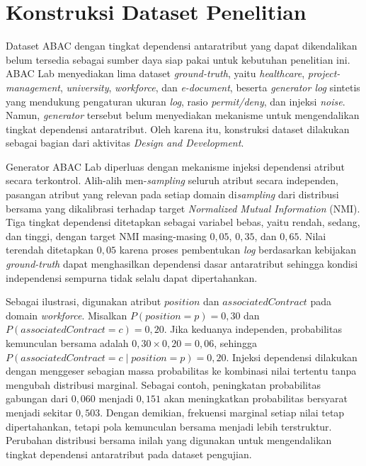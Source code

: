 \section{Konstruksi Dataset Penelitian}

Dataset ABAC dengan tingkat dependensi antaratribut yang dapat dikendalikan belum tersedia sebagai sumber daya siap pakai untuk kebutuhan penelitian ini. 
ABAC Lab menyediakan lima dataset \textit{ground-truth}, yaitu \textit{healthcare}, \textit{project-management}, \textit{university}, \textit{workforce}, dan \textit{e-document}, beserta \textit{generator log} sintetis yang mendukung pengaturan ukuran \textit{log}, rasio \textit{permit/deny}, dan injeksi \textit{noise}. 
Namun, \textit{generator} tersebut belum menyediakan mekanisme untuk mengendalikan tingkat dependensi antaratribut. 
Oleh karena itu, konstruksi dataset dilakukan sebagai bagian dari aktivitas \textit{Design and Development}.

Generator ABAC Lab diperluas dengan mekanisme injeksi dependensi atribut secara terkontrol. 
Alih-alih men-\textit{sampling} seluruh atribut secara independen, pasangan atribut yang relevan pada setiap domain di\textit{sampling} dari distribusi bersama yang dikalibrasi terhadap target \textit{Normalized Mutual Information} (NMI)\label{first:nmi}. 
Tiga tingkat dependensi ditetapkan sebagai variabel bebas, yaitu rendah, sedang, dan tinggi, dengan target NMI masing-masing $0,05$, $0,35$, dan $0,65$. 
Nilai terendah ditetapkan $0,05$ karena proses pembentukan \textit{log} berdasarkan kebijakan \textit{ground-truth} dapat menghasilkan dependensi dasar antaratribut sehingga kondisi independensi sempurna tidak selalu dapat dipertahankan.

Sebagai ilustrasi, digunakan atribut $position$ dan $associatedContract$ pada domain \textit{workforce}. Misalkan $P(position=p)=0{,}30$ dan $P(associatedContract=c)=0{,}20$. 
Jika keduanya independen, probabilitas kemunculan bersama adalah $0{,}30\times0{,}20=0{,}06$, sehingga $P(associatedContract=c\mid position=p)=0{,}20$. 
Injeksi dependensi dilakukan dengan menggeser sebagian massa probabilitas ke kombinasi nilai tertentu tanpa mengubah distribusi marginal. 
Sebagai contoh, peningkatan probabilitas gabungan dari $0,060$ menjadi $0,151$ akan meningkatkan probabilitas bersyarat menjadi sekitar $0,503$. 
Dengan demikian, frekuensi marginal setiap nilai tetap dipertahankan, tetapi pola kemunculan bersama menjadi lebih terstruktur. 
Perubahan distribusi bersama inilah yang digunakan untuk mengendalikan tingkat dependensi antaratribut pada dataset pengujian.

